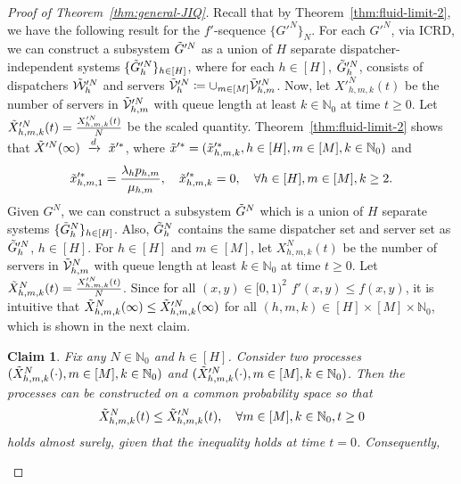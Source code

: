 \documentclass[11pt, reqno]{article}
\newtheorem{claim}[theorem]{Claim}
\numberwithin{equation}{section}
\numberwithin{theorem}{section}
\newcommand{\dto}{\ensuremath{\ \xrightarrow{d} \ }}  %
\newcommand{\N}{\mathbb{N}}                 %
\begin{document}
\begin{proof}[Proof of Theorem~\ref{thm:general-JIQ}]
Recall that by Theorem~\ref{thm:fluid-limit-2}, we have the following result for the $f'$-sequence $\{G'^N\}_N$. 
For each $G'^N$, via ICRD, we can construct a subsystem $\Tilde{G}'^N$ as a union of $H$ separate dispatcher-independent systems $\{\Tilde{G}'^N_h\}_{h\in[H]}$, where for each $h\in[H]$, $\Tilde{G}'^N_h$, consists of dispatchers $\Tilde{\mathcal{W}}'^N_h$ and servers $\Tilde{\mathcal{V}}'^N_h\coloneqq\cup_{m\in[M]}\Tilde{\mathcal{V}}'^N_{h,m}$. 
Now, let $X'^N_{h,m,k}(t)$ be the number of servers in $\Tilde{\mathcal{V}}'^N_{h,m}$ with queue length at least $k\in\N_0$ at time $t\geq 0$. 
Let $\Tilde{X}'^N_{h,m,k}(t)=\frac{X'^N_{h,m,k}(t)}{N}$ be the scaled quantity. 
Theorem~\ref{thm:fluid-limit-2} shows that  $\Tilde{X}'^N(\infty)\dto\Tilde{x}'^*$, where $\Tilde{x}'^*=(\Tilde{x}'^*_{h,m,k},h\in[H],m\in[M],k\in\N_0)$ and 
\begin{equation}\label{eq:tilde-G'-steady}
    \Tilde{x}'^*_{h,m,1}=\frac{\lambda_hp_{h,m}}{\mu_{h,m}}, \quad \Tilde{x}'^*_{h,m,k}=0, \quad \forall h\in[H], m\in[M],k\geq 2.
\end{equation}
Given $G^N$, we can construct a subsystem $\Tilde{G}^N$ which is a union of $H$ separate systems $\{\Tilde{G}^N_h\}_{h\in[H]}$. 
Also, $\Tilde{G}^N_h$ contains the same dispatcher set and server set as $\Tilde{G}'^N_h$, $h\in[H]$. For $h\in[H]$ and $m\in[M]$, let $X^N_{h,m,k}(t)$ be the number of servers in $\Tilde{\mathcal{V}}^N_{h,m}$ with queue length at least $k\in\N_0$ at time $t\geq 0$. Let $\Tilde{X}^N_{h,m,k}(t)=\frac{X'^N_{h,m,k}(t)}{N}$. 
Since for all $(x,y)\in[0,1)^2$ $f'(x,y)\leq f(x,y)$, it is intuitive that $\Tilde{X}^N_{h,m,k}(\infty)\leq \Tilde{X}'^N_{h,m,k}(\infty)$ for all $(h,m,k)\in[H]\times[M]\times\N_0$, which is shown in the next claim.
\begin{claim}\label{claim:monotonicity}
Fix any $N\in\N_0$ and $h\in[H]$. Consider two processes $(\Tilde{X}^N_{h,m,k}(\cdot), m\in[M],k\in\N_0)$ and $(\Tilde{X}'^N_{h,m,k}(\cdot), m\in[M],k\in\N_0)$. 
Then the processes can be constructed on a common probability space so that 
\begin{equation}\label{eq:5.1-ineq}
\Tilde{X}^N_{h,m,k}(t)\leq \Tilde{X}'^N_{h,m,k}(t), \quad \forall m\in[M],k\in\N_0,t\geq 0    
\end{equation}
holds almost surely, given that the inequality holds at time $t=0$. Consequently, 

\end{claim}
\end{proof}
\end{document}
